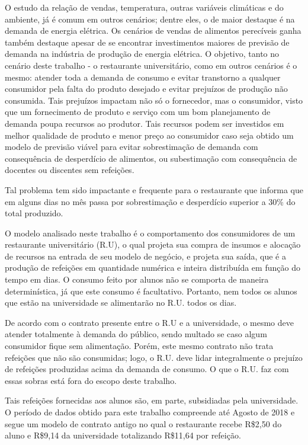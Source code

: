 \documentclass[	12pt, Times, openright, twoside, a4paper, english, brazil]{abntex2}
\begin{document}
        O estudo da relação de vendas, temperatura, outras variáveis climáticas e do ambiente, já é comum em outros cenários; dentre eles, o de maior destaque é na demanda de energia elétrica. Os cenários de vendas de alimentos perecíveis ganha também destaque apesar de se encontrar investimentos maiores de previsão de demanda na indústria de produção de energia elétrica. O objetivo, tanto no cenário deste trabalho - o restaurante universitário, como em outros cenários é o mesmo: atender toda a demanda de consumo e evitar transtorno a qualquer consumidor pela falta do produto desejado e evitar prejuízos de produção não consumida. Tais prejuízos impactam não só o fornecedor, mas o consumidor, visto que um fornecimento de produto e serviço com um bom planejamento de demanda poupa recursos ao produtor. Tais recursos podem ser investidos em melhor qualidade de produto e menor preço ao consumidor caso seja obtido um modelo de previsão viável para evitar sobrestimação de demanda com consequência de desperdício de alimentos, ou subestimação com consequência de docentes ou discentes sem refeições. 

        Tal problema tem sido impactante e frequente para o restaurante que informa que em alguns dias no mês passa por sobrestimação e desperdício superior a 30\% do total produzido.

        O modelo analisado neste trabalho é o comportamento dos consumidores de um restaurante universitário (R.U), o qual projeta sua compra de insumos e alocação de recursos na entrada de seu modelo de negócio, e projeta sua saída, que é a produção de refeições em quantidade numérica e inteira distribuída em função do tempo em dias. O consumo feito por alunos não se comporta de maneira determinística, já que este consumo é facultativo. Portanto, nem todos os alunos que estão na universidade se alimentarão no R.U. todos os dias.

        De acordo com o contrato presente entre o R.U e a universidade, o mesmo deve atender totalmente à demanda do público, sendo multado se caso algum consumidor fique sem alimentação. Porém, este mesmo contrato não trata refeições que não são consumidas; logo, o R.U. deve lidar integralmente o prejuízo de refeições produzidas acima da demanda de consumo. O que o R.U. faz com essas sobras está fora do escopo deste trabalho.

        Tais refeições fornecidas aos alunos são, em parte, subsidiadas pela universidade. O período de dados obtido para este trabalho compreende até Agosto de 2018 e segue um modelo de contrato antigo no qual o restaurante recebe R\$2,50 do aluno e R\$9,14 da universidade totalizando R\$11,64 por refeição.
\end{document}
